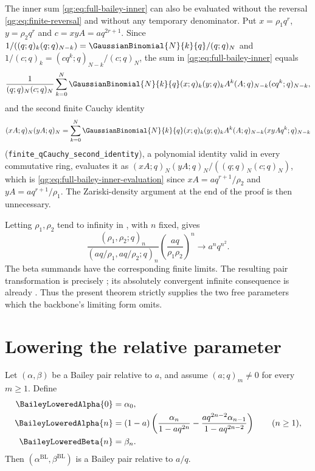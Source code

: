 \begin{remark}
\label{qg:rem:full-bailey-cauchy-route}
The inner sum \eqref{qg:eq:full-bailey-inner} can also be evaluated without
the reversal \eqref{qg:eq:finite-reversal} and without any temporary
denominator.  Put \(x=\rho_1q^r\), \(y=\rho_2q^r\) and \(c=xyA=aq^{2r+1}\).
Since \(1/((q;q)_k(q;q)_{N-k})=\GaussianBinomial{N}{k}{q}/(q;q)_N\) and
\(1/(c;q)_k=(cq^k;q)_{N-k}/(c;q)_N\), the sum in
\eqref{qg:eq:full-bailey-inner} equals
\[
 \frac{1}{(q;q)_N(c;q)_N}
 \sum_{k=0}^{N}\GaussianBinomial{N}{k}{q}
 (x;q)_k(y;q)_kA^k(A;q)_{N-k}(cq^k;q)_{N-k},
\]
and the second finite Cauchy identity
\[
 (xA;q)_N(yA;q)_N
 =\sum_{k=0}^{N}\GaussianBinomial{N}{k}{q}
 (x;q)_k(y;q)_kA^k(A;q)_{N-k}(xyAq^k;q)_{N-k}
\]
(\texttt{finite\_qCauchy\_second\_identity}), a polynomial identity valid in
every commutative ring, evaluates it as
\((xA;q)_N(yA;q)_N/((q;q)_N(c;q)_N)\), which is
\eqref{qg:eq:full-bailey-inner-evaluation} since \(xA=aq^{r+1}/\rho_2\) and
\(yA=aq^{r+1}/\rho_1\).  The Zariski-density argument at the end of the proof
is then unnecessary.
\end{remark}

\begin{remark}
\label{qg:rem:bailey-limiting-reference}
Letting \(\rho_1,\rho_2\) tend to infinity in
, with \(n\) fixed, gives
\[
 \frac{(\rho_1,\rho_2;q)_n}
      {(aq/\rho_1,aq/\rho_2;q)_n}
 \left(\frac{aq}{\rho_1\rho_2}\right)^n
 \longrightarrow a^nq^{n^2}.
\]
The beta summands have the corresponding finite limits.  The resulting pair
transformation is precisely ; its absolutely
convergent infinite consequence is already
.  Thus the present theorem strictly supplies
the two free parameters which the backbone's limiting form omits.
\end{remark}

\section{Lowering the relative parameter}
\label{qg:sec:bailey-parameter-lowering}

\begin{lemma}
\label{qg:lem-bailey-lowering}
Let \((\alpha,\beta)\) be a Bailey pair relative to \(a\), and assume
\((a;q)_m\ne0\) for every \(m\ge1\).  Define
\begin{align}
 \BaileyLoweredAlpha{0}&=\alpha_0,
 \label{qg:eq:bailey-lowering-zero}\\
 \BaileyLoweredAlpha{n}
 &=(1-a)\left(
 \frac{\alpha_n}{1-aq^{2n}}
 -\frac{aq^{2n-2}\alpha_{n-1}}{1-aq^{2n-2}}
 \right)
 \qquad(n\ge1),
 \label{qg:eq:bailey-lowering-positive}\\
 \BaileyLoweredBeta{n}&=\beta_n.
 \label{qg:eq:bailey-lowering-beta}
\end{align}
Then \((\alpha^{\mathrm{BL}},\beta^{\mathrm{BL}})\) is a Bailey pair
relative to \(a/q\).
\end{lemma}

